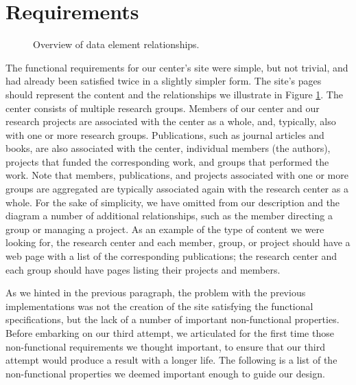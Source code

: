 \documentclass[10pt]{article}
\begin{document}
\section{Requirements}
\label{sec:req}
\begin{figure}
\begin{center}
\leavevmode
{}
\end{center}
\caption{
\label{fig:diag}
Overview of data element relationships.}
\end{figure}
The functional requirements for our center's site were
simple, but not trivial, and had already been satisfied
twice in a slightly simpler form.
The site's pages should represent the content and the relationships
we illustrate in Figure \ref{fig:diag}.
The center consists of multiple research groups.
Members of our center and our research projects are
associated with the center as a whole, and, typically, also
with one or more research groups.
Publications, such as journal articles and books,
are also associated with the center, individual members (the authors),
projects that funded the corresponding work,
and groups that performed the work.
Note that members, publications, and projects associated
with one or more groups are aggregated are typically associated
again with the research center as a whole.
For the sake of simplicity,
we have omitted from our description and the diagram
a number of additional relationships,
such as the member directing a group or managing a project.
As an example of the type of content we were looking for,
the research center and
each member, group, or project should have a web page with a list
of the corresponding publications;
the research center and each group should have pages listing
their projects and members.

As we hinted in the previous paragraph, the problem with
the previous implementations was not the creation of the site
satisfying the functional specifications,
but the lack of a number of important non-functional properties.
Before embarking on our third attempt,
we articulated for the first time those non-functional requirements
we thought important, to ensure that our third attempt would produce
a result with a longer life.
The following is a list of the non-functional properties
we deemed important enough to guide our design.
\end{document}
